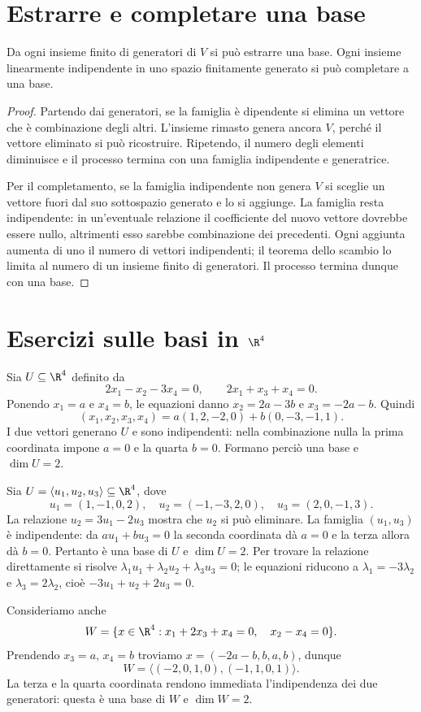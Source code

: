 \section{Estrarre e completare una base}
\begin{proposizione}
Da ogni insieme finito di generatori di $V$ si può estrarre una base.
Ogni insieme linearmente indipendente in uno spazio finitamente
generato si può completare a una base.
\end{proposizione}
\begin{proof}
Partendo dai generatori, se la famiglia è dipendente si elimina un
vettore che è combinazione degli altri. L'insieme rimasto genera
ancora $V$, perché il vettore eliminato si può ricostruire. Ripetendo,
il numero degli elementi diminuisce e il processo termina con una
famiglia indipendente e generatrice.

Per il completamento, se la famiglia indipendente non genera $V$ si
sceglie un vettore fuori dal suo sottospazio generato e lo si
aggiunge. La famiglia resta indipendente: in un'eventuale relazione
il coefficiente del nuovo vettore dovrebbe essere nullo, altrimenti
esso sarebbe combinazione dei precedenti. Ogni aggiunta aumenta di
uno il numero di vettori indipendenti; il teorema dello scambio lo
limita al numero di un insieme finito di generatori. Il processo
termina dunque con una base.
\end{proof}

\section{Esercizi sulle basi in \texorpdfstring{$\R^4$}{R4}}
\begin{esercizio}
Sia $U\subseteq\R^4$ definito da
\[
2x_1-x_2-3x_4=0,\qquad 2x_1+x_3+x_4=0.
\]
Ponendo $x_1=a$ e $x_4=b$, le equazioni danno
$x_2=2a-3b$ e $x_3=-2a-b$. Quindi
\[
(x_1,x_2,x_3,x_4)
=a(1,2,-2,0)+b(0,-3,-1,1).
\]
I due vettori generano $U$ e sono indipendenti: nella combinazione
nulla la prima coordinata impone $a=0$ e la quarta $b=0$. Formano
perciò una base e $\dim U=2$.
\end{esercizio}

\begin{esercizio}
Sia $U=\langle u_1,u_2,u_3\rangle\subseteq\R^4$, dove
\[
u_1=(1,-1,0,2),\quad u_2=(-1,-3,2,0),\quad
u_3=(2,0,-1,3).
\]
La relazione $u_2=3u_1-2u_3$ mostra che $u_2$ si può eliminare.
La famiglia $(u_1,u_3)$ è indipendente: da
$a u_1+b u_3=0$ la seconda coordinata dà $a=0$ e la terza
allora dà $b=0$. Pertanto è una base di $U$ e $\dim U=2$.
Per trovare la relazione direttamente si risolve
$\lambda_1u_1+\lambda_2u_2+\lambda_3u_3=0$; le equazioni riducono a
$\lambda_1=-3\lambda_2$ e $\lambda_3=2\lambda_2$, cioè
$-3u_1+u_2+2u_3=0$.

Consideriamo anche
\[
W=\{x\in\R^4:x_1+2x_3+x_4=0,\quad x_2-x_4=0\}.
\]
Prendendo $x_3=a$, $x_4=b$ troviamo
$x=(-2a-b,b,a,b)$, dunque
\[
W=\langle(-2,0,1,0),(-1,1,0,1)\rangle.
\]
La terza e la quarta
coordinata rendono immediata l'indipendenza dei due generatori:
questa è una base di $W$ e $\dim W=2$.
\end{esercizio}
